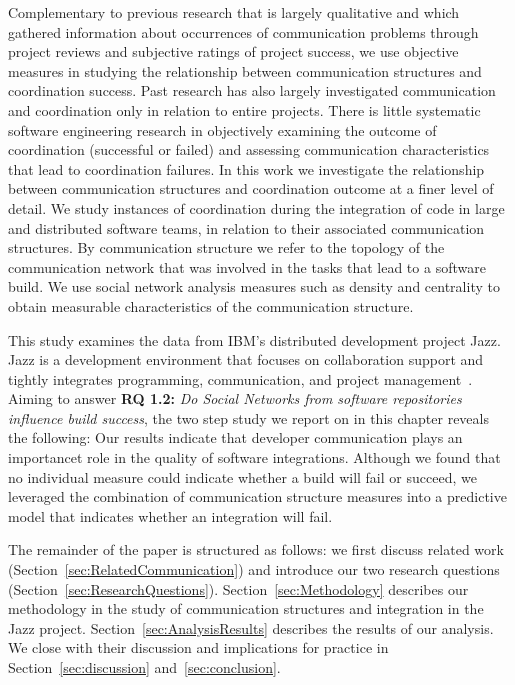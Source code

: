 Complementary to previous research that is largely qualitative
\cite{herbsleb2003:speed,Holmstrom:2006gd} and which gathered information about
occurrences of communication problems through project reviews and subjective
ratings of project success, we use objective measures in studying the
relationship between communication structures and coordination success. Past
research has also largely investigated communication and coordination only in
relation to entire projects. There is little systematic software engineering
research in objectively examining the outcome of coordination (successful or
failed) and assessing communication characteristics that lead to coordination
failures. In this work we investigate the relationship between communication
structures and coordination outcome at a finer level of detail. We study
instances of coordination during the integration of code in large and distributed
software teams, in relation to their associated communication structures. By
communication structure we refer to the topology of the communication network
that was involved in the tasks that lead to a software build. We use social
network analysis measures such as density and centrality to obtain measurable
characteristics of the communication structure.


This study examines the data from IBM's distributed development project Jazz. Jazz
is a development environment that focuses on collaboration support and tightly
integrates programming, communication, and project
management~\cite{frost:ieeesoftware:2007}. 
Aiming to answer \textbf{RQ 1.2:} \emph{Do Social Networks from software repositories influence build success},  the two step study we report on in this chapter reveals the following: Our
results indicate that developer communication plays an importancet role in the
quality of software integrations. Although we found that no individual measure
could indicate whether a build will fail or succeed, we leveraged the combination
of communication structure measures into a predictive model that indicates
whether an integration will fail.

The remainder of the paper is structured as follows: we first discuss related
work (Section~\ref{sec:RelatedCommunication}) and introduce our two research
questions (Section~\ref{sec:ResearchQuestions}). Section~\ref{sec:Methodology}
describes our methodology in the study of communication structures and
integration in the Jazz project. Section~\ref{sec:AnalysisResults} describes the
results of our analysis. We close with their discussion and implications for
practice in Section~\ref{sec:discussion} and~\ref{sec:conclusion}.





